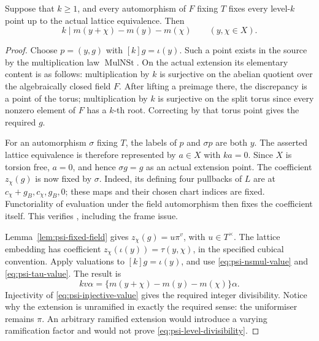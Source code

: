\begin{srlemma}
\label{lem:psi-level-divisibility}
Suppose that \(k\geq1\), and every automorphism of \(F\) fixing \(T\)
fixes every level-\(k\) point up to the actual lattice equivalence.
Then
\[
       k\mid m(y+\chi)-m(y)-m(\chi)\qquad(y,\chi\in X).
 \tag{PU7}\label{eq:psi-level-divisibility}
\]
\end{srlemma}
\begin{proof}
Choose \(p=(y,g)\) with \([k]g=\iota(y)\).
Such a point exists in the source by the multiplication law
\(\operatorname{MulNSt}\).  On the actual extension its elementary
content is as follows: multiplication by \(k\) is surjective on the
abelian quotient over the algebraically closed field \(F\).
After lifting a preimage there, the discrepancy is a point of the
torus; multiplication by \(k\) is surjective on the split torus since
every nonzero element of \(F\) has a \(k\)-th root.  Correcting by that
torus point gives the required \(g\).

For an automorphism \(\sigma\) fixing \(T\), the labels of \(p\) and
\(\sigma p\) are both \(y\).  The asserted lattice equivalence is
therefore represented by \(a\in X\) with \(ka=0\).
Since \(X\) is torsion free, \(a=0\), and hence
\(\sigma g=g\) as an actual extension point.
The coefficient \(z_\chi(g)\) is now fixed by \(\sigma\).
Indeed, its defining four pullbacks of \(L\) are at
\(c_\chi+g_B,c_\chi,g_B,0\); these maps and their chosen chart indices
are fixed.  Functoriality of evaluation under the field automorphism
then fixes the coefficient itself.  This verifies
, including the frame issue.

Lemma~\ref{lem:psi-fixed-field} gives
\(z_\chi(g)=u\pi^v\), with \(u\in T^\times\).
The lattice embedding has coefficient
\(z_\chi(\iota(y))=\tau(y,\chi)\), in the specified cubical convention.
Apply valuations to \([k]g=\iota(y)\), and use
\eqref{eq:psi-nsmul-value} and \eqref{eq:psi-tau-value}.
The result is
\[
       kv\alpha
          =\{m(y+\chi)-m(y)-m(\chi)\}\alpha .
\]
Injectivity of \eqref{eq:psi-injective-value} gives the required
integer divisibility.  Notice why the extension is unramified in
exactly the required sense: the uniformiser remains \(\pi\).
An arbitrary ramified extension would introduce a varying
ramification factor and would not prove \eqref{eq:psi-level-divisibility}.
\end{proof}

